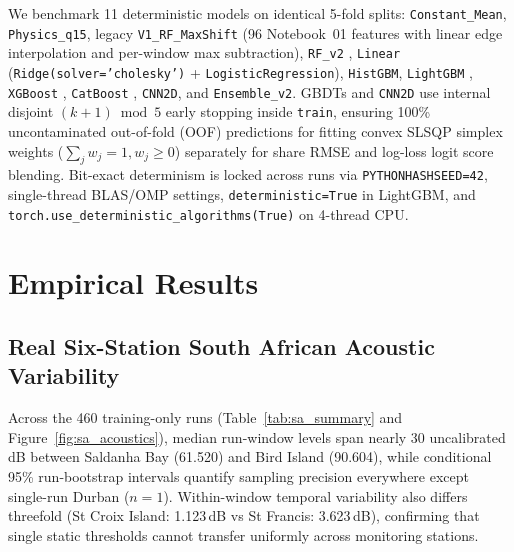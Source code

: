 \documentclass[10pt,a4paper]{article}
\begin{document}
We benchmark 11 deterministic models on identical 5-fold splits: \texttt{Constant\_Mean}, \texttt{Physics\_q15}, legacy \texttt{V1\_RF\_MaxShift} (96 Notebook~01 features with linear edge interpolation and per-window max subtraction), \texttt{RF\_v2} \parencite{breiman2001rf}, \texttt{Linear} (\texttt{Ridge(solver='cholesky')} + \texttt{LogisticRegression}), \texttt{HistGBM}, \texttt{LightGBM} \parencite{ke2017lightgbm}, \texttt{XGBoost} \parencite{chen2016xgboost}, \texttt{CatBoost} \parencite{prokhorenkova2018catboost}, \texttt{CNN2D}, and \texttt{Ensemble\_v2}. GBDTs and \texttt{CNN2D} use internal disjoint $(k+1)\bmod 5$ early stopping inside \texttt{train}, ensuring 100\% uncontaminated out-of-fold (OOF) predictions for fitting convex SLSQP simplex weights ($\sum_j w_j = 1, w_j \ge 0$) separately for share RMSE and log-loss logit score blending. Bit-exact determinism is locked across runs via \texttt{PYTHONHASHSEED=42}, single-thread BLAS/OMP settings, \texttt{deterministic=True} in LightGBM, and \texttt{torch.use\_deterministic\_algorithms(True)} on 4-thread CPU.

\section{Empirical Results}

\subsection{Real Six-Station South African Acoustic Variability}
Across the 460 training-only runs (Table~\ref{tab:sa_summary} and Figure~\ref{fig:sa_acoustics}), median run-window levels span nearly 30 uncalibrated dB between Saldanha Bay (61.520) and Bird Island (90.604), while conditional 95\% run-bootstrap intervals quantify sampling precision everywhere except single-run Durban ($n=1$). Within-window temporal variability also differs threefold (St Croix Island: 1.123\,dB vs St Francis: 3.623\,dB), confirming that single static thresholds cannot transfer uniformly across monitoring stations.
\end{document}
